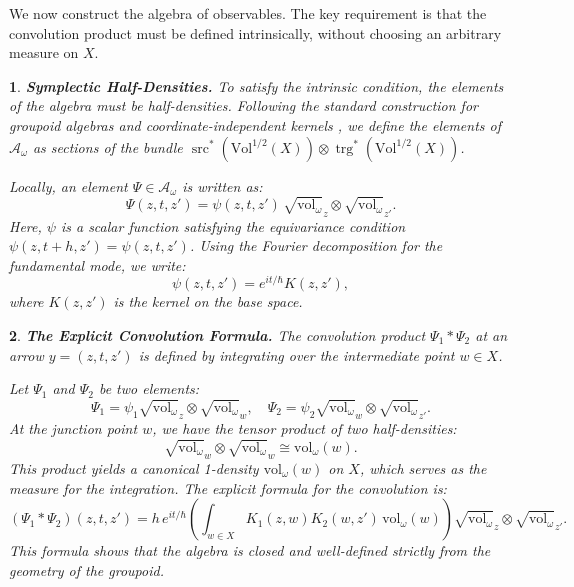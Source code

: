 \documentclass[11pt,reqno,letterpaper,twoside]{amsart}
\theoremstyle{articlestyle}
\newtheorem{article}{}
\theoremstyle{plain}
\theoremstyle{definition}
\def\artlabel[#1]{\textbf{#1.}}
\newcommand{\cA}{{\mathcal A}}
\DeclareMathOperator{\src}{src}
\DeclareMathOperator{\trg}{trg}
\newcommand{\0}{\hat{0}}
\newcommand{\1}{\hat{1}}
\newcommand{\Vol}{\mathrm{Vol}}
\newcommand{\vol}{\mathrm{vol}}
\begin{document}
  We now construct the algebra of observables.
  The key requirement is that the convolution product must be defined intrinsically,
  without choosing an arbitrary measure on $X$.
  
  \begin{article}\artlabel[Symplectic Half-Densities]
    To satisfy the intrinsic condition,
    the elements of the algebra must be \emph{half-densities}.
    Following the standard construction for groupoid algebras 
    and coordinate-independent kernels \cite{Con94, Hor71},
    we define the elements of $\cA_\omega$ as sections of the bundle 
    $\src^*(\Vol^{1/2}(X)) \otimes \trg^*(\Vol^{1/2}(X))$.
    
    Locally, an element $\Psi \in \cA_\omega$ is written as:
    $$
      \Psi(z, t, z') = \psi(z, t, z') \, \sqrt{\vol_\omega}_z \otimes \sqrt{\vol_\omega}_{z'}.
      $$
    Here, $\psi$ is a scalar function satisfying the equivariance condition $\psi(z, t+h, z') = \psi(z, t, z')$.
    Using the Fourier decomposition for the fundamental mode, we write:
    $$
      \psi(z, t, z') = e^{it/\hbar} K(z, z'),
      $$
    where $K(z, z')$ is the kernel on the base space.
  \end{article}
  
  \begin{article}\artlabel[The Explicit Convolution Formula]
    The convolution product $\Psi_1 * \Psi_2$ at an arrow $y = (z, t, z')$
    is defined by integrating over the intermediate point $w \in X$.
    
    Let $\Psi_1$ and $\Psi_2$ be two elements:
    $$
      \Psi_1 = \psi_1 \sqrt{\vol_\omega}_z \otimes \sqrt{\vol_\omega}_w, \quad
      \Psi_2 = \psi_2 \sqrt{\vol_\omega}_w \otimes \sqrt{\vol_\omega}_{z'}.
      $$
    At the junction point $w$,
    we have the tensor product of two half-densities:
    $$
      \sqrt{\vol_\omega}_w \otimes \sqrt{\vol_\omega}_w \cong \vol_\omega(w).
      $$
    This product yields a canonical 1-density $\vol_\omega(w)$ on $X$,
    which serves as the measure for the integration.
    The explicit formula for the convolution is:
    $$
      (\Psi_1 * \Psi_2)(z, t, z') =
      h \, e^{it/\hbar} \left( \int_{w \in X} K_1(z, w) K_2(w, z') \, \vol_\omega(w) \right)
      \sqrt{\vol_\omega}_z \otimes \sqrt{\vol_\omega}_{z'}.
      $$
    This formula shows that the algebra is closed and well-defined
    strictly from the geometry of the groupoid.
  \end{article}
  
  
\end{document}
